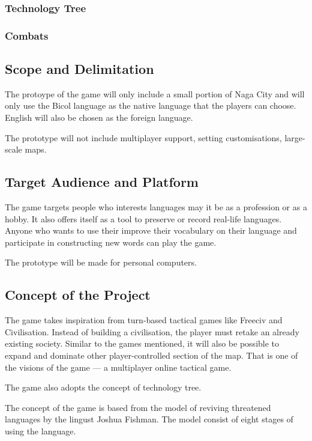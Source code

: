 \documentclass[11pt]{article}
\begin{document}
\subsubsection{Technology Tree}

\subsubsection{Combats}



\subsection{Scope and Delimitation}
The protoype of the game will only include a small portion of Naga City and will only use the Bicol language as the native language that the players can choose. English will also be chosen as the foreign language.

The prototype will not include multiplayer support, setting customisations, large-scale maps.



\subsection{Target Audience and Platform}
The game targets people who interests languages may it be as a profession or as a hobby. It also offers itself as a tool to preserve or record real-life languages. Anyone who wants to use their improve their vocabulary on their language and participate in constructing new words can play the game.

The prototype will be made for personal computers.

\subsection{Concept of the Project}
The game takes inspiration from turn-based tactical games like Freeciv and Civilisation. Instead of building a civilisation, the player must retake an already existing society. Similar to the games mentioned, it will also be possible to expand and dominate other player-controlled section of the map. That is one of the visions of the game --- a multiplayer online tactical game.

The game also adopts the concept of technology tree. 

The concept of the game is based from the model of reviving threatened languages by the lingust Joshua Fishman. The model consist of eight stages of using the language. 
\end{document}
